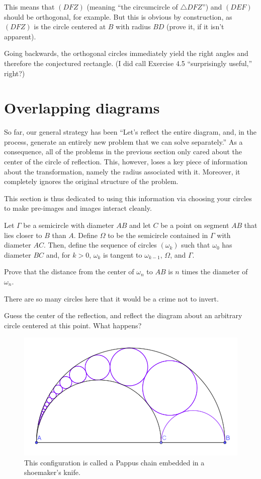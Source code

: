 \documentclass{scrartcl}
\begin{document}
This means that $(DFZ)$ (meaning ``the circumcircle of $\triangle DFZ$'')
and $(DEF)$ should be orthogonal, for example.
But this is obvious by construction, as $(DFZ)$ is the circle
centered at $B$ with radius $BD$ (prove it, if it isn't apparent).

Going backwards, the orthogonal circles immediately yield the right angles
and therefore the conjectured rectangle.
(I did call Exercise 4.5 ``surprisingly useful,'' right?)

\pagebreak

\section{Overlapping diagrams}
So far, our general strategy has been ``Let's reflect the entire diagram,
and, in the process, generate an entirely new problem
that we can solve separately.''
As a consequence, all of the problems in the previous section
only cared about the center of the circle of reflection.
This, however, loses a key piece of information about the transformation,
namely the radius associated with it.
Moreover, it completely ignores the original structure of the problem.

This section is thus dedicated to using this information
via choosing your circles to make pre-images and images interact cleanly.

\begin{problem}
	Let $\Gamma$ be a semicircle with diameter $AB$ and
	let $C$ be a point on segment $AB$ that lies closer to $B$ than $A$.
	Define $\Omega$ to be the semicircle contained in $\Gamma$
	with diameter $AC$.
	Then, define the sequence of circles $(\omega_k)$
	such that $\omega_0$ has diameter $BC$ and, for $k > 0$,
	$\omega_k$ is tangent to $\omega_{k-1}$, $\Omega$, and $\Gamma$.
	
	Prove that the distance from the center of $\omega_n$ to $AB$ is
	$n$ times the diameter of $\omega_n$.
\end{problem}

There are so many circles here that it would be a crime not to invert.
\begin{exercise}
	Guess the center of the reflection, and reflect the diagram
	about an arbitrary circle centered at this point.
	What happens?
\end{exercise}

\begin{figure}[h]
	\centering
	\includegraphics[width=0.7\linewidth]{shoemaker_diagram}
	\caption{This configuration is called a Pappus chain embedded in a shoemaker's knife.}
	\label{fig:shoemakerdiagram}
\end{figure}
\end{document}
